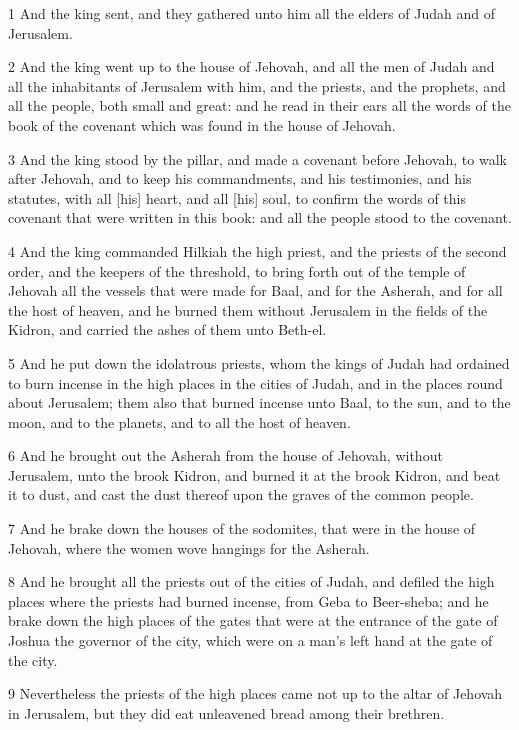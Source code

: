 \par 1 And the king sent, and they gathered unto him all the elders of Judah and of Jerusalem.
\par 2 And the king went up to the house of Jehovah, and all the men of Judah and all the inhabitants of Jerusalem with him, and the priests, and the prophets, and all the people, both small and great: and he read in their ears all the words of the book of the covenant which was found in the house of Jehovah.
\par 3 And the king stood by the pillar, and made a covenant before Jehovah, to walk after Jehovah, and to keep his commandments, and his testimonies, and his statutes, with all [his] heart, and all [his] soul, to confirm the words of this covenant that were written in this book: and all the people stood to the covenant.
\par 4 And the king commanded Hilkiah the high priest, and the priests of the second order, and the keepers of the threshold, to bring forth out of the temple of Jehovah all the vessels that were made for Baal, and for the Asherah, and for all the host of heaven, and he burned them without Jerusalem in the fields of the Kidron, and carried the ashes of them unto Beth-el.
\par 5 And he put down the idolatrous priests, whom the kings of Judah had ordained to burn incense in the high places in the cities of Judah, and in the places round about Jerusalem; them also that burned incense unto Baal, to the sun, and to the moon, and to the planets, and to all the host of heaven.
\par 6 And he brought out the Asherah from the house of Jehovah, without Jerusalem, unto the brook Kidron, and burned it at the brook Kidron, and beat it to dust, and cast the dust thereof upon the graves of the common people.
\par 7 And he brake down the houses of the sodomites, that were in the house of Jehovah, where the women wove hangings for the Asherah.
\par 8 And he brought all the priests out of the cities of Judah, and defiled the high places where the priests had burned incense, from Geba to Beer-sheba; and he brake down the high places of the gates that were at the entrance of the gate of Joshua the governor of the city, which were on a man's left hand at the gate of the city.
\par 9 Nevertheless the priests of the high places came not up to the altar of Jehovah in Jerusalem, but they did eat unleavened bread among their brethren.

